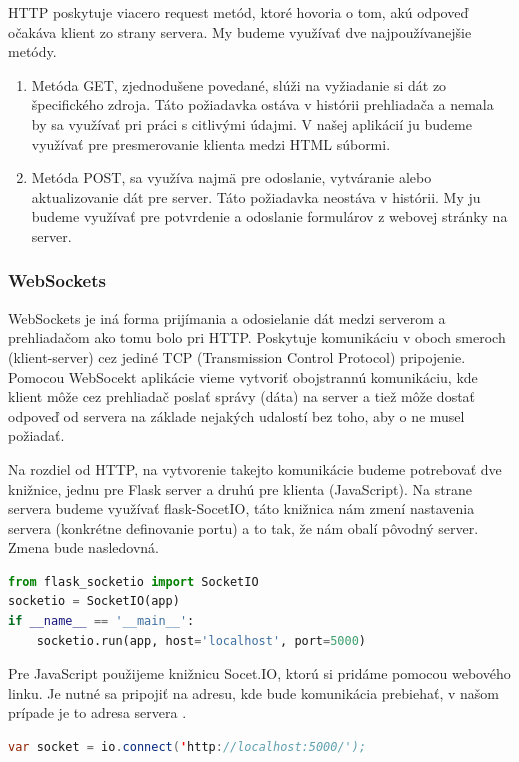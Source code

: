 HTTP poskytuje viacero request metód, ktoré hovoria o tom, akú odpoveď očakáva klient zo strany servera. My budeme využívať dve najpoužívanejšie metódy.
\begin{enumerate}
\item { Metóda GET, zjednodušene povedané, slúži na vyžiadanie si dát zo špecifického zdroja. Táto požiadavka ostáva v histórii prehliadača a nemala by sa využívať pri práci s citlivými údajmi. V našej aplikácií ju budeme využívať pre presmerovanie klienta medzi HTML súbormi.  
}
\item { Metóda POST, sa využíva najmä pre odoslanie, vytváranie alebo aktualizovanie dát pre server. Táto požiadavka neostáva v histórii. My ju budeme využívať pre potvrdenie a odoslanie formulárov z webovej stránky na server.  
}
\end{enumerate}

\subsubsection{WebSockets}
WebSockets je iná forma prijímania a odosielanie dát medzi serverom a prehliadačom ako tomu bolo pri HTTP. Poskytuje komunikáciu v oboch smeroch (klient-server) cez jediné TCP (Transmission Control Protocol) pripojenie. Pomocou WebSocekt aplikácie vieme vytvoriť obojstrannú komunikáciu, kde klient môže cez prehliadač poslať správy (dáta) na server a tiež môže dostať odpoveď od servera na základe nejakých udalostí bez toho, aby o ne musel požiadať. \cite{bib6}

Na rozdiel od HTTP, na vytvorenie takejto komunikácie budeme potrebovať dve knižnice, jednu pre Flask server a druhú pre klienta (JavaScript). Na strane servera budeme využívať flask-SocetIO, táto knižnica nám zmení nastavenia servera (konkrétne definovanie portu) a to tak, že nám obalí pôvodný server. Zmena bude nasledovná.
\begin{lstlisting}[language=Python]
from flask_socketio import SocketIO
socketio = SocketIO(app)
if __name__ == '__main__':
	socketio.run(app, host='localhost', port=5000)
\end{lstlisting}
Pre JavaScript použijeme knižnicu Socet.IO, ktorú si pridáme pomocou webového linku. Je nutné sa pripojiť na adresu, kde bude komunikácia prebiehať, v našom prípade je to adresa servera \cite{bib3}.
\begin{lstlisting}[language=Java]
var socket = io.connect('http://localhost:5000/');
\end{lstlisting}

